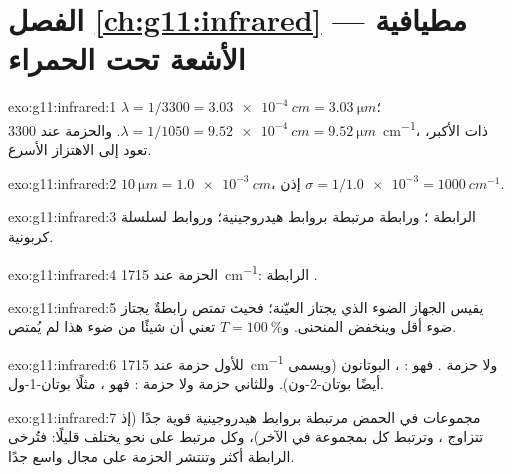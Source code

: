 \section*{الفصل \ref{ch:g11:infrared} --- مطيافية الأشعة تحت الحمراء}

\begin{solution}{exo:g11:infrared:1}
$\lambda = 1/3300 = \qty{3.03e-4}{cm} = \qty{3.03}{\micro m}$؛
$\lambda = 1/1050 = \qty{9.52e-4}{cm} = \qty{9.52}{\micro m}$. والحزمة عند
\qty{3300}{cm^{-1}}، ذات  الأكبر، تعود إلى الاهتزاز
الأسرع.
\end{solution}

\begin{solution}{exo:g11:infrared:2}
$\qty{10}{\micro m} = \qty{1.0e-3}{cm}$، إذن $\sigma = 1/\num{1.0e-3} =
\qty{1000}{cm^{-1}}$.
\end{solution}

\begin{solution}{exo:g11:infrared:3}
الرابطة  ؛ ورابطة   مرتبطة بروابط هيدروجينية؛
وروابط  لسلسلة كربونية.
\end{solution}

\begin{solution}{exo:g11:infrared:4}
الحزمة عند \qty{1715}{cm^{-1}}: الرابطة .
\end{solution}

\begin{solution}{exo:g11:infrared:5}
يقيس الجهاز الضوء الذي يجتاز العيّنة؛ فحيث تمتص رابطةٌ يجتاز ضوء أقل
وينخفض المنحنى. و$T =
\qty{100}{\percent}$ تعني أن شيئًا من ضوء هذا  لم
يُمتص.
\end{solution}

\begin{solution}{exo:g11:infrared:6}
للأول حزمة  عند \qty{1715}{cm^{-1}} ولا حزمة
. فهو : ، البوتانون (ويسمى أيضًا
بوتان-2-ون). وللثاني حزمة  ولا حزمة : فهو
، مثلًا بوتان-1-ول.
\end{solution}

\begin{solution}{exo:g11:infrared:7}
مجموعات  في الحمض مرتبطة بروابط هيدروجينية قوية جدًا (إذ تتزاوج
، وترتبط كل  بمجموعة  في  الآخر)،
وكل  مرتبط على نحو يختلف قليلًا: فتُرخى الرابطة
أكثر وتنتشر الحزمة على مجال واسع جدًا.
\end{solution}

